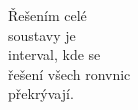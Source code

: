 \documentclass[preview]{standalone}
\begin{document}
\begin{center}
Řešením celé\\soustavy je\\interval, kde se \\ řešení všech ronvnic\\  překrývají.
\end{center}
\end{document}
